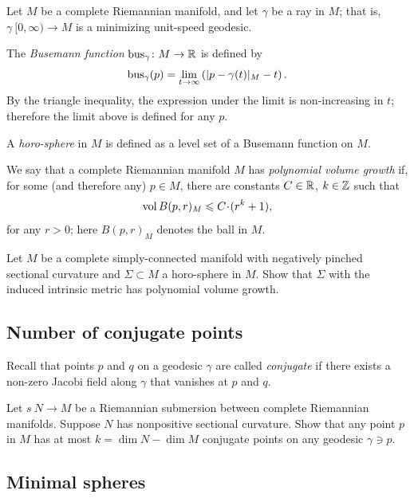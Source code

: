 Let $M$ be a complete Riemannian manifold,
and let $\gamma$ be a ray in $M$;
that is, $\gamma\:[0, \infty)\to M$ is a minimizing unit-speed geodesic.

The \label{page:Busemann function}\emph{Busemann function} $\operatorname{\rm bus}\nolimits_\gamma\colon M\to\mathbb{R}$ is defined by
$$\operatorname{\rm bus}\nolimits_\gamma(p)=\lim_{t\to\infty}\left(|p-\gamma(t)|_M-t\right).$$
By the triangle inequality, 
the expression under the limit is non-increasing in $t$; 
therefore  the limit above is defined for any $p$.

A \emph{horo-sphere} in $M$ is defined as a level set of a Busemann function
on $M$.

We say that a complete Riemannian manifold $M$ has \emph{polynomial volume growth} if, for some (and therefore any) $p\in M$, there are constants $C\in \mathbb{R}$, $k\in\mathbb{Z}$ such that
$$\vol B(p,r)_M\z\le C\cdot (r^k+1),$$ 
for any $r>0$;
here $B(p,r)_M$ denotes the ball in $M$.

\begin{pr} Let $M$ be a complete simply-connected manifold with negatively pinched sectional curvature
and $\Sigma\subset M$ a horo-sphere in $M$.
Show that
$\Sigma$ with the induced intrinsic metric 
has polynomial volume growth.
\end{pr}

\subsection*{Number of conjugate points}
\label{Number of conjugate points}

Recall that points $p$ and $q$ on a geodesic $\gamma$ are called \emph{conjugate} if there exists a non-zero Jacobi field along $\gamma$ that vanishes at $p$ and $q$. 

\begin{pr}
Let $s\:N\to M$ be a Riemannian submersion between complete Riemannian manifolds.
Suppose $N$ has nonpositive sectional curvature.
Show that any point $p$ in $M$ has at most $k=\dim N-\dim M$ conjugate points on any geodesic $\gamma\ni p$.
\end{pr}

\subsection*{Minimal spheres}
\label{Minimal spheres}

